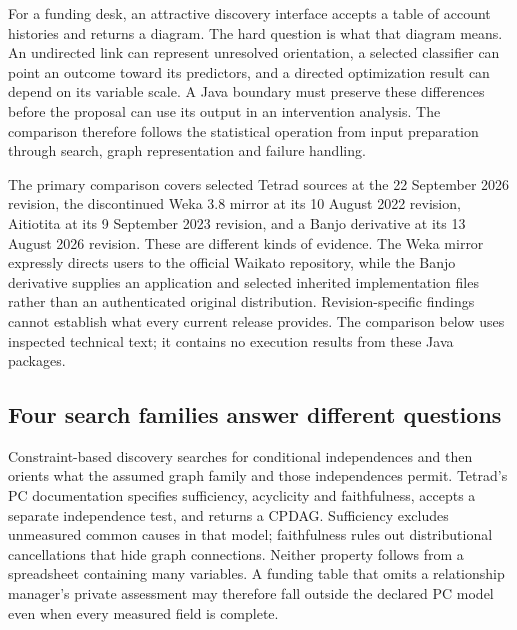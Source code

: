 \label{exec13:java-discovery}

For a funding desk, an attractive discovery interface accepts a table of
account histories and returns a diagram. The hard question is what that
diagram means. An undirected link can represent unresolved orientation,
a selected classifier can point an outcome toward its predictors, and a
directed optimization result can depend on its variable scale. A Java
boundary must preserve these differences before the proposal can use its
output in an intervention analysis. The comparison therefore follows the
statistical operation from input preparation through search, graph
representation and failure handling.

The primary comparison covers selected Tetrad sources at the 22
September 2026 revision, the discontinued Weka 3.8 mirror at its 10
August 2022 revision, Aitiotita at its 9 September 2023 revision, and a
Banjo derivative at its 13 August 2026 revision. These are different
kinds of evidence. The Weka mirror expressly directs users to the
official Waikato repository, while the Banjo derivative supplies an
application and selected inherited implementation files rather than an
authenticated original distribution. Revision-specific findings cannot
establish what every current release provides. The comparison below uses
inspected technical text; it contains no execution results from these
Java packages.
\citep{exec13_java_tetrad,exec13_java_weka,exec13_java_aitiotita,exec13_java_banjo}

\hypertarget{four-search-families-answer-different-questions}{%
\subsection{Four search families answer different
questions}\label{four-search-families-answer-different-questions}}

Constraint-based discovery searches for conditional independences and
then orients what the assumed graph family and those independences
permit. Tetrad's PC documentation specifies sufficiency, acyclicity and
faithfulness, accepts a separate independence test, and returns a CPDAG.
Sufficiency excludes unmeasured common causes in that model;
faithfulness rules out distributional cancellations that hide graph
connections. Neither property follows from a spreadsheet containing many
variables. A funding table that omits a relationship manager's private
assessment may therefore fall outside the declared PC model even when
every measured field is complete. \citep{exec13_java_tetrad}

